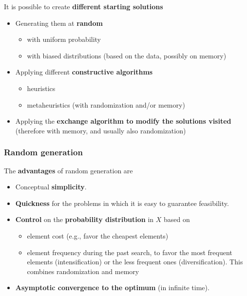 \documentclass[11pt]{article}
\begin{document}
	It is possible to create \textbf{different starting solutions}
	\begin{itemize}
		\item Generating them at \textbf{random}
		\begin{itemize}
			\item with uniform probability
			\item with biased distributions (based on the data, possibly on memory)
		\end{itemize}
		\nn
		
		\item Applying different \textbf{constructive algorithms}
		\begin{itemize}
			\item heuristics
			\item metaheuristics (with randomization and/or memory)
		\end{itemize}
		\nn
		
		\item Applying the \textbf{exchange algorithm to modify the solutions visited} (therefore with memory, and usually also randomization)
	\end{itemize}
	
	\newpage
	
	\subsubsection{Random generation}
	
	The \textbf{advantages} of random generation are
	\begin{itemize}
		\item Conceptual \textbf{simplicity}.\\
		
		\item \textbf{Quickness} for the problems in which it is easy to guarantee feasibility.\\
		
		\item \textbf{Control} on the \textbf{probability distribution} in $X$ based on
		\begin{itemize}
			\item element cost (e.g., favor the cheapest elements)
			
			\item element frequency during the past search, to favor the most frequent elements (intensification) or the less frequent ones (diversification). This combines randomization and memory
		\end{itemize}
		\nn
		
		\item \textbf{Asymptotic convergence to the optimum} (in infinite time).\\
	\end{itemize}
	
\end{document}
